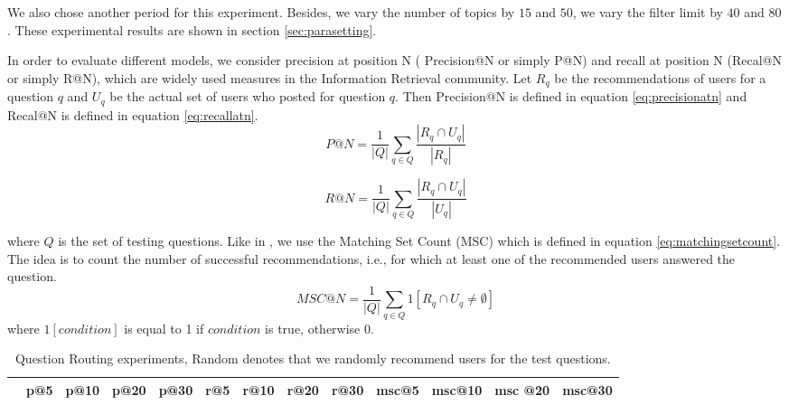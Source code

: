 {{{{{{{We also chose another period for this experiment. Besides, we vary the number of topics by $15$ and $50$, we vary the filter limit by $40$ and $80$. These experimental results are shown in section \ref{sec:parasetting}.

In order to evaluate different models, we consider precision at position N ( Precision@N or simply P@N) and recall at position N (Recal@N or simply R@N), which are widely used measures in the Information Retrieval community. Let $R_q$ be the recommendations of users for a question $q$ and $U_q$ be the actual set of users who posted for question $q$. Then Precision@N is defined in equation \ref{eq:precisionatn} and Recal@N is defined in equation \ref{eq:recallatn}.
\begin{equation}%
 P@N = \frac{1}{|Q|}\sum_{q \in Q}\frac{|R_q \cap U_q|}{|R_q|}
\label{eq:precisionatn}
 \end{equation}
 
 \begin{equation}%
 R@N = \frac{1}{|Q|}\sum_{q \in Q}\frac{|R_q \cap U_q|}{|U_q|}
\label{eq:recallatn}
 \end{equation}

\noindent
where $Q$ is the set of testing questions. Like in \cite{Chang:2013}, we use the Matching Set Count (MSC)  
which is defined in equation \ref{eq:matchingsetcount}. The idea is to count the number of successful recommendations, i.e., for which at least one of the recommended users answered the question.
 \begin{equation}%
 MSC@N = \frac{1}{|Q|}\sum_{q \in Q} 1[R_q \cap U_q \neq \emptyset]
\label{eq:matchingsetcount}
 \end{equation}
 where $1[condition]$ is equal to 1 if $condition$ is true, otherwise 0. 

\begin{sidewaystable}
\caption{Question Routing experiments, Random denotes that we randomly recommend users for the test questions.}
\label{tab:qrouting}
\centering
\begin{tabular}{|c|c|c|c|c|c|c|c|c|c|c|c|c|}
\hline
 & p@5    &p@10    &p@20   & p@30 &r@5 & r@10 & r@20 &r@30 & msc@5 & msc@10 &msc @20 &msc@30  \\ \hline



\end{tabular}
\end{sidewaystable}}}}}}}}
